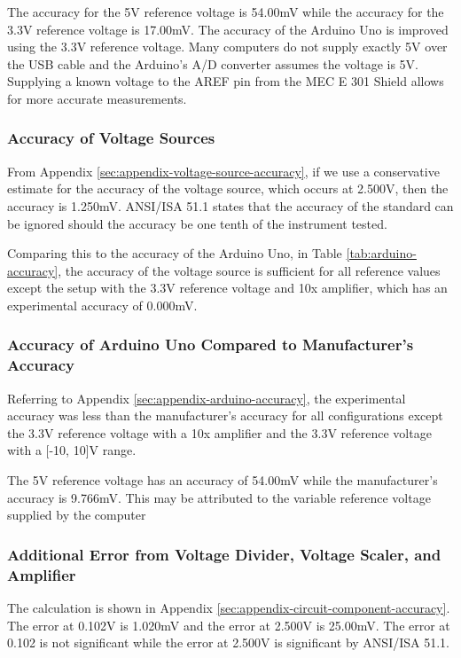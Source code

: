The accuracy for the 5V reference voltage is 54.00mV while the accuracy for the 3.3V reference voltage is 17.00mV. The accuracy of the Arduino Uno is improved
using the 3.3V reference voltage. Many computers do not supply exactly 5V over the USB cable and the Arduino's A/D converter assumes the voltage is 5V. 
Supplying a known voltage to the AREF pin from the MEC E 301 Shield allows for more accurate measurements.

\subsubsection{Accuracy of Voltage Sources}
From Appendix \ref{sec:appendix-voltage-source-accuracy}, if we use a conservative estimate for the accuracy of the voltage source, which occurs at 2.500V, then the accuracy is 1.250mV. ANSI/ISA 51.1 states that the accuracy of the standard
can be ignored should the accuracy be one tenth of the instrument tested. %

Comparing this to the accuracy of the Arduino Uno, in Table \ref{tab:arduino-accuracy}, the accuracy of 
the voltage source is sufficient for all reference values except the setup with the 3.3V reference voltage and 10x amplifier, which has an experimental accuracy of 0.000mV.


\subsubsection{Accuracy of Arduino Uno Compared to Manufacturer's Accuracy}
Referring to Appendix \ref{sec:appendix-arduino-accuracy}, the experimental accuracy was less than the manufacturer's accuracy for all configurations 
except the 3.3V reference voltage with a 10x amplifier and the 3.3V reference voltage with a [-10, 10]V range.

The 5V reference voltage has an accuracy of 54.00mV while the manufacturer's accuracy is 9.766mV. This may be attributed to the variable reference voltage supplied by the computer


\subsubsection{Additional Error from Voltage Divider, Voltage Scaler, and Amplifier}

The calculation is shown in Appendix \ref{sec:appendix-circuit-component-accuracy}. The error at 0.102V is 1.020mV and the error at 2.500V is 25.00mV. The error at 0.102 
is not significant while the error at 2.500V is significant by ANSI/ISA 51.1.













        